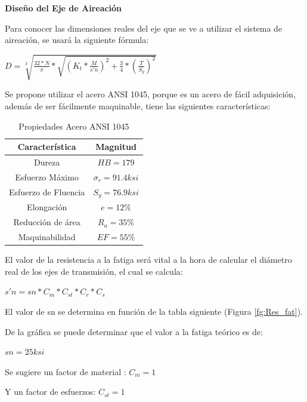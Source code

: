 \textbf{Diseño del Eje de Aireación}

Para conocer las dimensiones reales del eje que se ve a utilizar el sistema de aireación, se usará la siguiente fórmula:

\begin{center}
    $D=\sqrt[3]{\frac{32*N}{\pi}*\sqrt{(K_t*\frac{M}{s'n})^2+ \frac{3}{4}*(\frac{T}{S_y})^2}}$
\end{center}

Se propone utilizar el acero ANSI 1045, porque es un acero de fácil adquisición, además de ser fácilmente maquinable,  tiene las siguientes características:

\begin{table}[h]
\begin{center}
\caption{Propiedades Acero ANSI 1045}
\begin{tabular}{| c | c | }
 \\ 
Característica & Magnitud \\ \hline
Dureza & $HB=179$  \\
Esfuerzo Máximo & $\sigma_r = 91.4 ksi$ \\
Esfuerzo de Fluencia & $S_y = 76.9 ksi$ \\
Elongación & $e=12\%$ \\ 
Reducción de área & $R_a=35\%$ \\ 
Maquinabilidad & $EF =55\%$ \\ 
    \end{tabular}
        \label{tab:A1045}
        \end{center}
\end{table}

El valor de la resistencia a la fatiga será vital a la hora de calcular el diámetro real de los ejes de transmisión, el cual se calcula:

\begin{center}
    $s'n =  sn*C_m*C_{st}*C_r*C_s$
\end{center}

El valor de sn se determina en función de la tabla siguiente (Figura \ref{fg:Res_fat}). 

De la gráfica se puede determinar que el valor a la fatiga teórico es de:

\begin{center}
    $sn=25 ksi$
\end{center}

Se sugiere un factor de material \cite{Mott}:
$C_m= 1$

Y un factor de esfuerzos:
$C_{st}=1$

